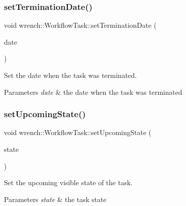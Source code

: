 \subsubsection{\texorpdfstring{set\+Termination\+Date()}{setTerminationDate()}}
{\footnotesize\ttfamily void wrench\+::\+Workflow\+Task\+::set\+Termination\+Date (\begin{DoxyParamCaption}\item[{double}]{date }\end{DoxyParamCaption})}



Set the date when the task was terminated. 


\begin{DoxyParams}{Parameters}
{\em date} & the date when the task was terminated \\
\hline
\end{DoxyParams}
\mbox{\label{classwrench_1_1_workflow_task_a6856c2c6b70109a061dc979a7417ef9d}} 
\subsubsection{\texorpdfstring{set\+Upcoming\+State()}{setUpcomingState()}}
{\footnotesize\ttfamily void wrench\+::\+Workflow\+Task\+::set\+Upcoming\+State (\begin{DoxyParamCaption}\item[{\hyperlink{classwrench_1_1_workflow_task_a1184f3d7aea21e1c87a9b17e84f1f92a}{Workflow\+Task\+::\+State}}]{state }\end{DoxyParamCaption})}



Set the upcoming visible state of the task. 


\begin{DoxyParams}{Parameters}
{\em state} & the task state \\
\hline
\end{DoxyParams}
\mbox{\label{classwrench_1_1_workflow_task_a6bd42ca8962628852c3ab7b16e81bd1c}} 
